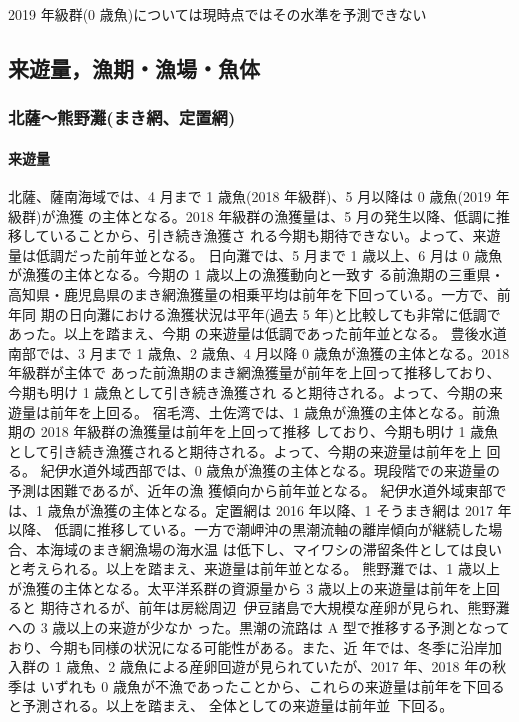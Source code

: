 \documentclass[11pt]{article}
\begin{document}
2019 年級群(0 歳魚)については現時点ではその水準を予測できない

\subsection{来遊量，漁期・漁場・魚体}
\subsubsection{北薩〜熊野灘(まき網、定置網)}
\paragraph{来遊量}
北薩、薩南海域では、4 月まで 1 歳魚(2018 年級群)、5 月以降は 0 歳魚(2019 年級群)が漁獲 の主体となる。2018 年級群の漁獲量は、5 月の発生以降、低調に推移していることから、引き続き漁獲さ れる今期も期待できない。よって、来遊量は低調だった前年並となる。
日向灘では、5 月まで 1 歳以上、6 月は 0 歳魚が漁獲の主体となる。今期の 1 歳以上の漁獲動向と一致す る前漁期の三重県・高知県・鹿児島県のまき網漁獲量の相乗平均は前年を下回っている。一方で、前年同 期の日向灘における漁獲状況は平年(過去 5 年)と比較しても非常に低調であった。以上を踏まえ、今期 の来遊量は低調であった前年並となる。
豊後水道南部では、3 月まで 1 歳魚、2 歳魚、4 月以降 0 歳魚が漁獲の主体となる。2018 年級群が主体で あった前漁期のまき網漁獲量が前年を上回って推移しており、今期も明け 1 歳魚として引き続き漁獲され ると期待される。よって、今期の来遊量は前年を上回る。
宿毛湾、土佐湾では、1 歳魚が漁獲の主体となる。前漁期の 2018 年級群の漁獲量は前年を上回って推移 しており、今期も明け 1 歳魚として引き続き漁獲されると期待される。よって、今期の来遊量は前年を上 回る。
紀伊水道外域西部では、0 歳魚が漁獲の主体となる。現段階での来遊量の予測は困難であるが、近年の漁 獲傾向から前年並となる。
紀伊水道外域東部では、1 歳魚が漁獲の主体となる。定置網は 2016 年以降、1 そうまき網は 2017 年以降、 低調に推移している。一方で潮岬沖の黒潮流軸の離岸傾向が継続した場合、本海域のまき網漁場の海水温 は低下し、マイワシの滞留条件としては良いと考えられる。以上を踏まえ、来遊量は前年並となる。
熊野灘では、1 歳以上が漁獲の主体となる。太平洋系群の資源量から 3 歳以上の来遊量は前年を上回ると 期待されるが、前年は房総周辺~伊豆諸島で大規模な産卵が見られ、熊野灘への 3 歳以上の来遊が少なか った。黒潮の流路は A 型で推移する予測となっており、今期も同様の状況になる可能性がある。また、近 年では、冬季に沿岸加入群の 1 歳魚、2 歳魚による産卵回遊が見られていたが、2017 年、2018 年の秋季は いずれも 0 歳魚が不漁であったことから、これらの来遊量は前年を下回ると予測される。以上を踏まえ、 全体としての来遊量は前年並~下回る。
\end{document}
